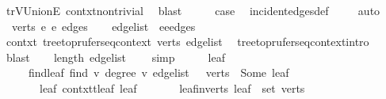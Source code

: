 \begin{isabellebody}
\ tr{\isachardot}{\kern0pt}V{\isacharunderscore}{\kern0pt}Union{\isacharunderscore}{\kern0pt}E\ contxt{\isachardot}{\kern0pt}non{\isacharunderscore}{\kern0pt}trivial\ \isamarkupfalse%
\ blast\isanewline
\ \ \isamarkupfalse%
\ \isamarkupfalse%
\ {\isacharquery}{\kern0pt}case\ \isamarkupfalse%
\ incident{\isacharunderscore}{\kern0pt}edges{\isacharunderscore}{\kern0pt}def\ \isamarkupfalse%
\ {}\ \isamarkupfalse%
\ auto\isanewline
{}\isamarkupfalse%
\isanewline
\ \ \isamarkupfalse%
\ {\isacharparenleft}{\kern0pt}{}\ verts\ e{}\ e{}\ edges{\isacharparenright}{\kern0pt}\isanewline
\ \ \isamarkupfalse%
\ {\isacharquery}{\kern0pt}edge{\isacharunderscore}{\kern0pt}list\ {\isacharequal}{\kern0pt}\ {\isachardoublequoteopen}e{}{\isacharhash}{\kern0pt}e{}{\isacharhash}{\kern0pt}edges{\isachardoublequoteclose}\isanewline
\ \ \isamarkupfalse%
\ contxt{\isacharcolon}{\kern0pt}\ tree{\isacharunderscore}{\kern0pt}to{\isacharunderscore}{\kern0pt}prufer{\isacharunderscore}{\kern0pt}seq{\isacharunderscore}{\kern0pt}context\ verts\ {\isacharquery}{\kern0pt}edge{\isacharunderscore}{\kern0pt}list\ \isamarkupfalse%
\ tree{\isacharunderscore}{\kern0pt}to{\isacharunderscore}{\kern0pt}prufer{\isacharunderscore}{\kern0pt}seq{\isacharunderscore}{\kern0pt}context{\isachardot}{\kern0pt}intro\ {}\ \isamarkupfalse%
\ blast\isanewline
\ \ \isamarkupfalse%
\ {\isachardoublequoteopen}length\ {\isacharquery}{\kern0pt}edge{\isacharunderscore}{\kern0pt}list\ {\isasymge}\ {}{\isachardoublequoteclose}\ \isamarkupfalse%
\ simp\isanewline
\ \ \isamarkupfalse%
\ \isamarkupfalse%
\ leaf\isanewline
\ \ \ \ \ find{\isacharunderscore}{\kern0pt}leaf{\isacharcolon}{\kern0pt}\ {\isachardoublequoteopen}find\ {\isacharparenleft}{\kern0pt}{\isasymlambda}v{\isachardot}{\kern0pt}\ degree\ v\ {\isacharquery}{\kern0pt}edge{\isacharunderscore}{\kern0pt}list\ {\isacharequal}{\kern0pt}\ {}{\isacharparenright}{\kern0pt}\ verts\ {\isacharequal}{\kern0pt}\ Some\ leaf{\isachardoublequoteclose}\isanewline
\ \ \ \ \ \ \ leaf{\isacharcolon}{\kern0pt}\ {\isachardoublequoteopen}contxt{\isachardot}{\kern0pt}t{\isachardot}{\kern0pt}leaf\ leaf{\isachardoublequoteclose}\isanewline
\ \ \ \ \ \ \ leaf{\isacharunderscore}{\kern0pt}in{\isacharunderscore}{\kern0pt}verts{\isacharcolon}{\kern0pt}\ {\isachardoublequoteopen}leaf\ {\isasymin}\ set\ verts{\isachardoublequoteclose}\isanewline

\end{isabellebody}
